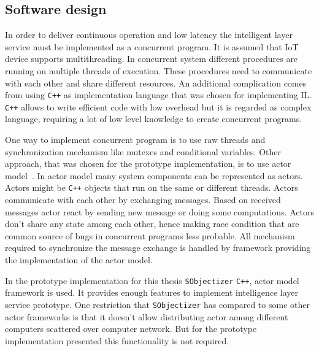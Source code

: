 \documentclass[english, 12pt, a4paper, elec, utf8, online]{aaltothesis}
\begin{document}
\subsection{Software design}
In order to deliver continuous operation and low latency the intelligent layer service must be implemented as a concurrent program. It is assumed that IoT device supports multithreading. In concurrent system different procedures are running on multiple threads of execution. These procedures need to communicate with each other and share different resources. An additional complication comes from using \texttt{C++} as implementation language that was chosen for implementing IL. \texttt{C++} allows to write efficient code with low overhead but it is regarded as complex language, requiring a lot of low level knowledge to create concurrent programs. 

One way to implement concurrent program is to use raw threads and synchronization mechanism like mutexes and conditional variables. Other approach, that was chosen for the prototype implementation, is to use actor model~\cite{agha1985actors}. In actor model many system components can be represented as actors. Actors might be \texttt{C++} objects that run on the same or different threads. Actors communicate with each other by exchanging messages. Based on received messages actor react by sending new message or doing some computations. Actors don't share any state among each other, hence making race condition that are common source of bugs in concurrent programs less probable. All mechanism required to synchronize the message exchange is handled by framework providing the implementation of the actor model.        
  
In the prototype implementation for this thesis \texttt{SObjectizer} \texttt{C++}, actor model framework is used. It provides enough features to implement intelligence layer service prototype. One restriction that \texttt{SObjectizer} has compared to some other actor frameworks is that it doesn't allow distributing actor among different computers scattered over computer network. But for the prototype implementation presented this functionality is not required.      
     
\end{document}
